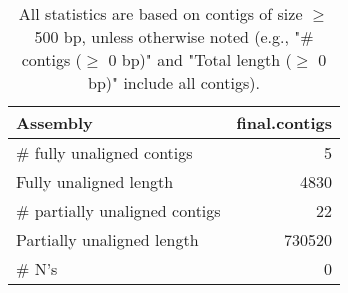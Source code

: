 \documentclass[12pt,a4paper]{article}
\begin{document}
\begin{table}[ht]
\begin{center}
\caption{All statistics are based on contigs of size $\geq$ 500 bp, unless otherwise noted (e.g., "\# contigs ($\geq$ 0 bp)" and "Total length ($\geq$ 0 bp)" include all contigs).}
\begin{tabular}{|l*{1}{|r}|}
\hline
Assembly & final.contigs \\ \hline
\# fully unaligned contigs & 5 \\ \hline
Fully unaligned length & 4830 \\ \hline
\# partially unaligned contigs & 22 \\ \hline
Partially unaligned length & 730520 \\ \hline
\# N's & 0 \\ \hline
\end{tabular}
\end{center}
\end{table}
\end{document}
